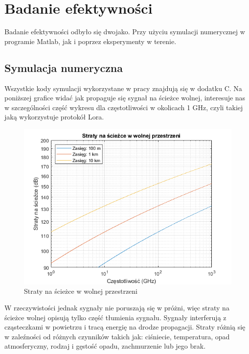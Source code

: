 \chapter{Badanie efektywności}
Badanie efektywności odbyło się dwojako. Przy użyciu symulacji numerycznej w programie Matlab, jak i poprzez eksperymenty w terenie.
\section{Symulacja numeryczna}
Wszystkie kody symulacji wykorzystane w pracy znajdują się w dodatku C.
Na poniższej grafice widać jak propaguje się sygnał na ścieżce wolnej, interesuje nas w szczególności część wykresu dla częstotliwości w okolicach 1 GHz, czyli takiej jaką wykorzystuje protokół Lora.
\begin{figure}[h!]
	\label{fig1}
	\includegraphics*{./grafika/num_sim1_straty_na_sciezce.png}
	\caption{Straty na ścieżce w wolnej przestrzeni}
\end{figure}


W rzeczywistości jednak sygnały nie poruszają się w próżni, więc straty na ścieżce wolnej opisują tylko część tłumienia sygnału.
Sygnały interferują z cząsteczkami w powietrzu i tracą energię na drodze propagacji. Straty różnią się w zaleźności od różnych czynników takich jak: ciśniecie, temperatura, opad atmosferyczny, rodzaj i gęstość opadu, zachmurzenie lub jego brak.

